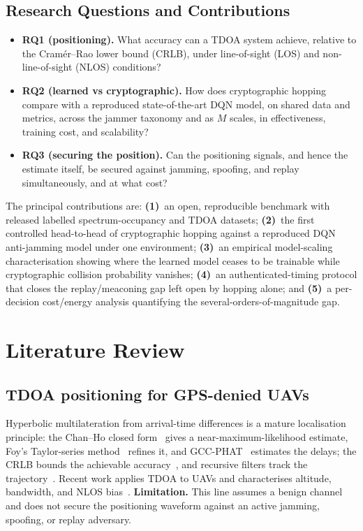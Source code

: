 \documentclass[11pt]{article}
\begin{document}
\subsection{Research Questions and Contributions}\label{sec:rq}
\begin{itemize}
\item \textbf{RQ1 (positioning).} What accuracy can a TDOA system achieve,
relative to the Cram\'er--Rao lower bound (CRLB), under line-of-sight (LOS) and
non-line-of-sight (NLOS) conditions?
\item \textbf{RQ2 (learned vs cryptographic).} How does cryptographic hopping
compare with a reproduced state-of-the-art DQN model, on shared data and
metrics, across the jammer taxonomy and as $M$ scales, in effectiveness,
training cost, and scalability?
\item \textbf{RQ3 (securing the position).} Can the positioning signals, and
hence the estimate itself, be secured against jamming, spoofing, and replay
simultaneously, and at what cost?
\end{itemize}
\noindent The principal contributions are: \textbf{(1)}~an open, reproducible
benchmark with released labelled spectrum-occupancy and TDOA datasets;
\textbf{(2)}~the first controlled head-to-head of cryptographic hopping against
a reproduced DQN anti-jamming model under one environment;
\textbf{(3)}~an empirical model-scaling characterisation showing where the
learned model ceases to be trainable while cryptographic collision probability
vanishes; \textbf{(4)}~an authenticated-timing protocol that closes the
replay/meaconing gap left open by hopping alone; and \textbf{(5)}~a per-decision
cost/energy analysis quantifying the several-orders-of-magnitude gap.

\section{Literature Review}\label{sec:lit}
\subsection{TDOA positioning for GPS-denied UAVs}
Hyperbolic multilateration from arrival-time differences is a mature
localisation principle: the Chan--Ho closed form~\cite{ref6} gives a
near-maximum-likelihood estimate, Foy's Taylor-series method~\cite{ref8}
refines it, and GCC-PHAT~\cite{ref7} estimates the delays; the CRLB bounds the
achievable accuracy~\cite{ref27,ref29,ref30}, and recursive
filters track the trajectory~\cite{ref26}. Recent work applies TDOA to UAVs and
characterises altitude, bandwidth, and NLOS bias~\cite{ref9,ref10,ref15}.
\textbf{Limitation.} This line assumes a benign channel and does not secure the
positioning waveform against an active jamming, spoofing, or replay adversary.
\end{document}
